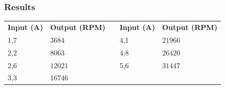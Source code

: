 \subsubsection{Results}
%
\begin{table}[H]
\begin{tabular}{|l|l|l| l|l|}
\cline{1-2}\cline{4-5}%
  \textbf{Input (A)}   & \textbf{Output (RPM)} &\phantom{hey}& \textbf{Input (A)}   & \textbf{Output (RPM)} \\
\cline{1-2}\cline{4-5}%
  1,7                &             $3684$    &             & 4,1                & $21966$               \\
\cline{1-2}\cline{4-5}%
  2,2                &             $8063$    &             & 4,8                & $26420$               \\
\cline{1-2}\cline{4-5}%
  2,6                &             $12021$   &             & 5,6                & $31447$               \\
\cline{1-2}\cline{4-5}%
  3,3                &             $16746$  \\
\cline{1-2}%
\end{tabular}
\end{table}
%
